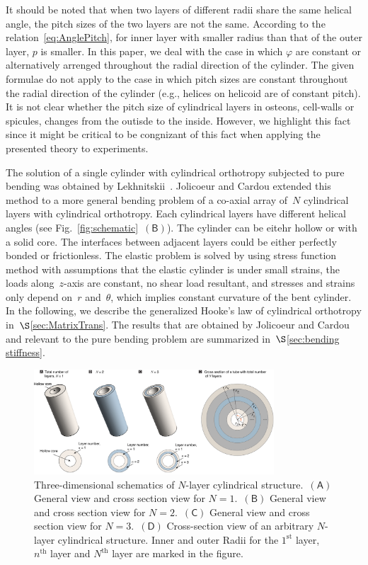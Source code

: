 \documentclass[preprint,12pt,times]{elsarticle}
\numberwithin{equation}{section}
\newcommand{\pr}[1]{\left( #1 \right)}
\newcommand{\subf}[1]{\pr{\textsf{#1}}}
\renewcommand{\>}{$\Rightarrow$}
\begin{document}
It should be noted that when two layers of different radii share the same helical angle, the pitch sizes of the two layers are not the same. According to the relation~\eqref{eq:AnglePitch}, for inner layer with smaller radius than that of the outer layer, $p$ is smaller. In this paper, we deal with the case in which $\varphi$ are constant or alternatively arrenged throughout the radial direction of the cylinder. The given formulae do not apply to the case in which pitch sizes are constant throughout the radial direction of the cylinder (e.g., helices on helicoid are of constant pitch). It is not clear whether the pitch size of cylindrical layers in osteons, cell-walls or spicules, changes from the outisde to the inside. However, we highlight this fact since it might be critical to be congnizant of this fact when applying the presented theory to experiments.

The solution of a single cylinder with cylindrical orthotropy subjected to pure bending was obtained by Lekhnitskii~\cite{Lekhnitskii1981}. Jolicoeur and Cardou extended this method to a more general bending problem of a co-axial array of~$N$ cylindrical layers with cylindrical orthotropy. Each cylindrical layers have different helical angles (see Fig.~\ref{fig:schematic}~$\subf{B}$). The cylinder can be eitehr hollow or with a solid core. The interfaces between adjacent layers could be either perfectly bonded or frictionless. The elastic problem is solved by using stress function method with assumptions that the elastic cylinder is under small strains, the loads along~$z$-axis are constant, no shear load resultant, and stresses and strains only depend on~$r$ and~$\theta$, which implies constant curvature of the bent cylinder. In the following, we describe the generalized Hooke's law of cylindrical orthotropy in~$\S$\ref{sec:MatrixTrans}. The results that are obtained by Jolicoeur and Cardou and relevant to the pure bending problem are summarized in~$\S$\ref{sec:bending stiffness}.


\begin{figure}[t]
  \centering
  \graphicspath{{../LyxFiles/figure/}}
   \includegraphics[width=0.8\textwidth]{Cylinder3D_V4.pdf}
  \caption{Three-dimensional schematics of  $N$-layer cylindrical structure.~$\subf{A}$ General view and cross section view for $N = 1$.~$\subf{B}$ General view and cross section view for $N = 2$.~$\subf{C}$ General view and cross section view for $N = 3$.~$\subf{D}$ Cross-section view of an arbitrary $N$-layer cylindrical structure. Inner and outer Radii for the $1^\text{st}$ layer, $n^\text{th}$ layer and $N^\text{th}$ layer are marked in the figure.}
  \label{fig:Cylinder3D}
\end{figure}
\end{document}
